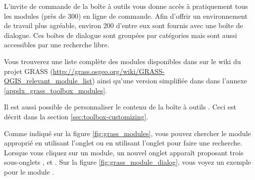 {%
L'invite de commande de la boîte à outils \grass vous donne accès à pratiquement tous les modules \grass (près de 300) en ligne de commande. Afin d'offrir un environnement de travail plus agréable, environ 200 d'entre eux sont fournis avec une boîte de dialogue. Ces boîtes de dialogue sont groupées par catégories mais sont aussi accessibles par une recherche libre. 


Vous trouverez une liste complète des modules \grass disponibles dans \qg \CURRENT sur le wiki du projet GRASS (\url{http://grass.osgeo.org/wiki/GRASS-QGIS_relevant_module_list}) ainsi qu'une version simplifiée dans dans l'annexe \ref{appdx_grass_toolbox_modules}.


Il est aussi possible de personnaliser le contenu de la boîte à outils \grass. Ceci est décrit dans la section \ref{sec:toolbox-customizing}.

Comme indiqué sur la figure \ref{fig:grass_modules}, vous pouvez chercher le module \grass approprié en utilisant l'onglet  ou en utilisant l'onglet  pour faire une recherche.
Lorsque vous cliquez sur un module, un nouvel onglet apparaît proposant trois sous-onglets ,  et . Sur la figure \ref{fig:grass_module_dialog}, vous voyez un exemple pour le module \grass {}.

}
